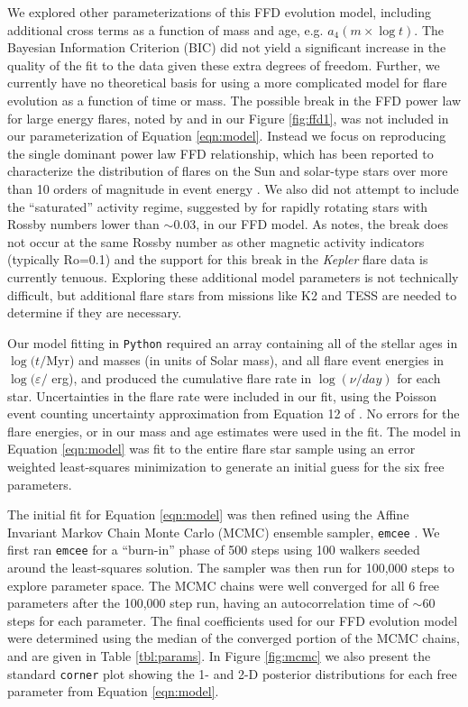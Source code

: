 \documentclass[preprint2]{aastex62}
\newcommand{\Kepler}{\textsl{Kepler}\xspace}
\begin{document}
We explored other parameterizations of this FFD evolution model, including additional cross terms as a function of mass and age, e.g. $a_4 (m \times \log t)$. The Bayesian Information Criterion (BIC) did not yield a significant increase in the quality of the fit to the data given these extra degrees of freedom. Further, we currently have no theoretical basis for using a more complicated model for flare evolution as a function of time or mass. The possible break in the FFD power law for large energy flares, noted by \citet{davenport2016} and in our Figure \ref{fig:ffd1}, was not included in our parameterization of Equation \ref{eqn:model}. Instead we focus on reproducing the single dominant power law FFD relationship, which has been reported to characterize the distribution of flares on the Sun and solar-type stars over more than 10 orders of magnitude in event energy \citep[e.g. Fig. 9 from][]{shibayama2013}. We also did not attempt to include the ``saturated'' activity regime, suggested by \citet{davenport2016} for rapidly rotating stars with Rossby numbers lower than $\sim$0.03, in our FFD model. As \citet{davenport2016} notes, the break does not occur at the same Rossby number as other magnetic activity indicators (typically Ro=0.1) and the support for this break in the \Kepler flare data is currently tenuous. Exploring these additional model parameters is not technically difficult, but additional flare stars from missions like K2 and TESS are needed to determine if they are necessary. 


Our model fitting in {\tt Python} required an array containing all of the stellar ages in $\log(t/$Myr) and masses (in units of Solar mass), and all flare event energies in $\log(\varepsilon/$ erg), and produced the cumulative flare rate in $\log (\nu/day)$ for each star. Uncertainties in the flare rate were included in our fit, using the Poisson event counting uncertainty approximation from Equation 12 of \citet{gehrels1986}. No errors for the flare energies, or in our mass and age estimates were used in the fit. The model in Equation \ref{eqn:model} was fit to the entire flare star sample using an error weighted least-squares minimization to generate an initial guess for the six free parameters.

The initial fit for Equation \ref{eqn:model} was then refined using the Affine Invariant Markov Chain Monte Carlo (MCMC) ensemble sampler, {\tt emcee} \citep{emcee}. We first ran {\tt emcee}  for a ``burn-in'' phase of 500 steps using 100 walkers seeded around the least-squares solution. The sampler was then run for 100,000 steps to explore parameter space. The MCMC chains were well converged for all 6 free parameters after the 100,000 step run, having an autocorrelation time of $\sim$60 steps for each parameter.
The final coefficients used for our FFD evolution model were determined using the median of the converged portion of the MCMC chains, and are given in Table \ref{tbl:params}. In Figure \ref{fig:mcmc} we also present the standard {\tt corner} plot \citep{corner} showing the 1- and 2-D posterior  distributions for each free parameter from Equation \ref{eqn:model}.
\end{document}
